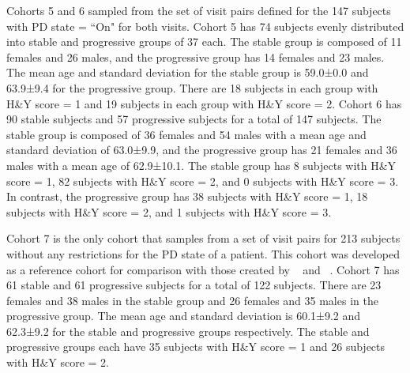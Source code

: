 Cohorts 5 and 6 sampled from the set of visit pairs defined for the 147 subjects with PD state = ``On" for both visits. Cohort 5 has 74 subjects evenly distributed into stable 
and progressive groups of 37 each. The stable group is composed of 11 females and 26 males, and the progressive group has 14 females and 23 males. The mean age and standard 
deviation for the stable group is 59.0±0.0 and 63.9±9.4 for the progressive group. There are 18 subjects in each group with H\&Y score = 1 and 19 subjects in each group 
with H\&Y score = 2. Cohort 6 has 90 stable subjects and 57 progressive subjects for a total of 147 subjects. The stable group is composed of 36 females and 54 males with a mean 
age and standard deviation of 63.0±9.9, and the progressive group has 21 females and 36 males with a mean age of 62.9±10.1. The stable group has 8 subjects with H\&Y score = 1, 82 subjects 
with H\&Y score = 2, and 0 subjects with H\&Y score = 3. In contrast, the progressive group has 38 subjects with H\&Y score = 1, 18 subjects with H\&Y score = 2, and 1 subjects with 
H\&Y score = 3. 

Cohort 7 is the only cohort that samples from a set of visit pairs for 213 subjects without any restrictions for the PD state of a patient. This cohort was developed as a 
reference cohort for comparison with those created by ~\cite{shu2021predicting} and ~\cite{Arafe2023.05.05.539590}. Cohort 7 has 61 stable and 61 progressive subjects for a total 
of 122 subjects. There are 23 females and 38 males in the stable group and 26 females and 35 males in the progressive group. The mean age and standard deviation is 60.1±9.2 and 
62.3±9.2 for the stable and progressive groups respectively. The stable and progressive groups each have 35 subjects with H\&Y score = 1 and 26 subjects with H\&Y score = 2. 